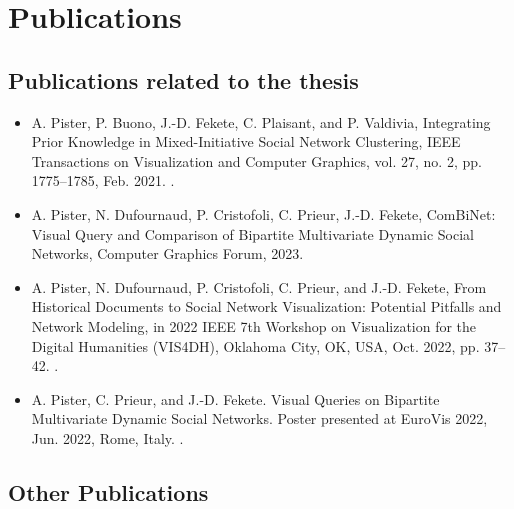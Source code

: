 \chapter*{Publications}

\section*{Publications related to the thesis}


\sloppy

\begin{itemize}
    \item A. Pister, P. Buono, J.-D. Fekete, C. Plaisant, and P. Valdivia, Integrating Prior Knowledge in Mixed-Initiative Social Network Clustering, IEEE Transactions on Visualization and Computer Graphics, vol. 27, no. 2, pp. 1775–1785, Feb. 2021. .
    \item A. Pister, N. Dufournaud, P. Cristofoli, C. Prieur, J.-D. Fekete, ComBiNet: Visual Query and Comparison of Bipartite Multivariate Dynamic Social Networks, Computer Graphics Forum, 2023.
    \item A. Pister, N. Dufournaud, P. Cristofoli, C. Prieur, and J.-D. Fekete, From Historical Documents to Social Network Visualization: Potential Pitfalls and Network Modeling, in 2022 IEEE 7th Workshop on Visualization for the Digital Humanities (VIS4DH), Oklahoma City, OK, USA, Oct. 2022, pp. 37–42. .
    \item  A. Pister, C. Prieur, and J.-D. Fekete. Visual Queries on Bipartite Multivariate Dynamic Social Networks. Poster presented at EuroVis 2022, Jun. 2022, Rome, Italy. .
\end{itemize}


\section*{Other Publications}

